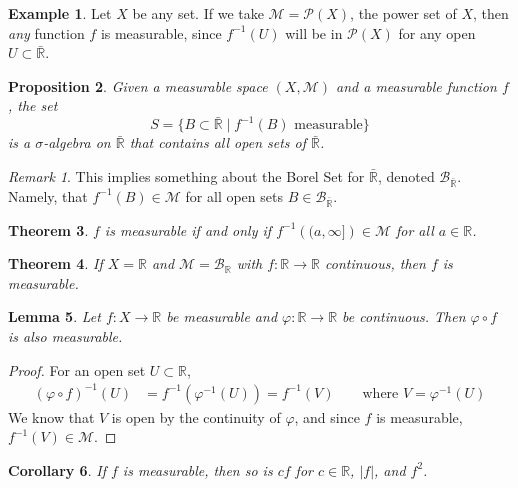 \documentclass[12pt]{article}
\theoremstyle{plain}
\newtheorem{thm}{Theorem}[subsection]
\newtheorem{lem}[thm]{Lemma}
\newtheorem{prop}[thm]{Proposition}
\newtheorem{cor}[thm]{Corollary}
\theoremstyle{definition}
\newtheorem{ex}[thm]{Example}
\theoremstyle{remark}
\newtheorem*{rmk}{Remark}
\begin{document}
\begin{ex}
Let $X$ be any set. If we take $\mathscr{M} = \mathscr{P}(X)$, the power set of $X$, then \emph{any} function $f$ is measurable, since $f^{-1}(U)$ will be in $\mathscr{P}(X)$ for any open $U\subset \bar{\mathbb{R}}$.
\end{ex}

\begin{prop}
Given a measurable space $(X,\mathscr{M})$ and a measurable function $f$, the set
\[
    S = \{B \subset \bar{\mathbb{R}} \; | \; f^{-1}(B) 
    \text{ measurable} \}
\]
is a $\sigma$-algebra on $\bar{\mathbb{R}}$ that contains all open sets of $\bar{\mathbb{R}}$.  
\end{prop}

\begin{rmk}
This implies something about the Borel Set for $\bar{\mathbb{R}}$, denoted $\mathscr{B}_{\bar{\mathbb{R}}}$. Namely, that $f^{-1}(B)\in \mathscr{M}$ for all open sets $B\in\mathscr{B}_{\bar{\mathbb{R}}}$.
\end{rmk}

\begin{thm}
\label{measequiv}
$f$ is measurable if and only if $f^{-1}\left((a,\infty]\right)\in\mathscr{M}$ for all $a\in\mathbb{R}$. 
\end{thm}

\begin{thm}
If $X=\mathbb{R}$ and $\mathscr{M}=\mathscr{B}_\mathbb{R}$ with $f:\mathbb{R}\rightarrow\mathbb{R}$ continuous, then $f$ is measurable.
\end{thm}

\begin{lem}
Let $f:X\rightarrow\mathbb{R}$ be measurable and $\varphi: \mathbb{R}\rightarrow\mathbb{R}$ be continuous. Then $\varphi\circ f$ is also measurable.
\end{lem}
\begin{proof}
For an open set $U\subset\mathbb{R}$, 
\begin{align*}
    (\varphi\circ f)^{-1}(U) &= 
        f^{-1}\left(\varphi^{-1}(U)\right)
    = f^{-1}(V) \qquad \text{where }V = \varphi^{-1}(U)
\end{align*}
We know that $V$ is open by the continuity of $\varphi$, and since $f$ is measurable, $f^{-1}(V)\in\mathscr{M}$.
\end{proof}

\begin{cor}
If $f$ is measurable, then so is $c f$ for $c\in\mathbb{R}$, $|f|$, and $f^2$.
\end{cor}
\end{document}
